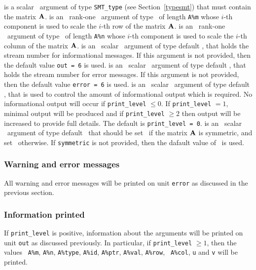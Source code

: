 \documentclass{galahad}
\begin{document}
\vspace*{-1mm}
\begin{description}
   is a scalar \intentinout\ argument of type {\tt SMT\_type} (see
     Section~\ref{typesmt}) that must contain the matrix ${\mathbf{A}}$.
   is an \optional\ rank-one \intentin\ argument of type \realdp\ of length
     {\tt A\%m} whose $i$-th component is used to scale the $i$-th
     row of the matrix ${\mathbf{A}}$.
   is an \optional\ rank-one \intentin\ argument of type \realdp\ of length
     {\tt A\%n} whose $i$-th component is used to scale the $i$-th
     column of the matrix ${\mathbf{A}}$.
   is an \optional\ scalar \intentin\ argument of type default \integer, that holds the
     stream number for informational messages. If this argument is not
     provided, then the default value {\tt out = 6} is used.
   is an \optional\ scalar \intentin\ argument of type default \integer, that holds the
     stream number for error messages. If this argument is not
     provided, then the default value {\tt error = 6} is used.
   is an \optional\ scalar \intentin\ argument of type default \integer, that is used
     to control the amount of informational output which is required. No
     informational output will occur if {\tt print\_level} $\leq 0$. If
     {\tt print\_level} $= 1$, minimal output will be produced and if
     {\tt print\_level} $\geq 2$ then output will be
     increased to provide full details.
     The default is {\tt print\_level = 0}.
   is an \optional\ scalar \intentin\ argument of type default
     \logical\ that should be set \true\ if the matrix ${\mathbf{A}}$ is
     symmetric, and set \false\ otherwise.  If {\tt symmetric} is not
     provided, then the dafault value of \false\ is used.
\end{description}

\subsubsection{Warning and error messages}\label{scaleA-error}

All warning and error messages will be printed on unit {\tt error} as
discussed in the previous section.

\subsubsection{Information printed}\label{scaleA-info}

If {\tt print\_level} is positive, information about the arguments
will be printed on unit {\tt out} as discussed previously.  In
particular, if {\tt print\_level} $\geq 1$, then the values {\tt
  A\%m}, {\tt A\%n}, {\tt A\%type}, {\tt A\%id},
{\tt A\%ptr}, {\tt A\%val}, {\tt A\%row}, {\tt
  A\%col}, {\tt u} and {\tt v} will be printed.
\end{document}
